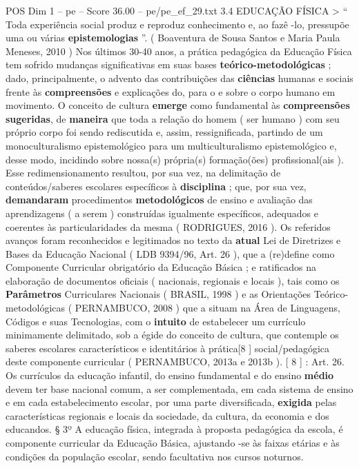 \begin{textsample}{POS Dim 1 – pe – Score 36.00 – pe/pe\_ef\_29.txt}  \label{ex:f1_pos_249}
3.4 EDUCAÇÃO FÍSICA > “ Toda experiência social produz e reproduz conhecimento e, ao fazê -lo, pressupõe uma ou várias \textbf{epistemologias} ”. ( Boaventura de Sousa Santos e Maria Paula Meneses, 2010 ) Nos últimos 30-40 anos, a prática pedagógica da Educação Física tem sofrido mudanças significativas em suas bases \textbf{teórico-metodológicas} ; dado, principalmente, o advento das contribuições das \textbf{ciências} humanas e sociais frente às \textbf{compreensões} e explicações do, para o e sobre o corpo humano em movimento.
O conceito de cultura \textbf{emerge} como fundamental às \textbf{compreensões} \textbf{sugeridas}, de \textbf{maneira} que toda a relação do homem ( ser humano ) com seu próprio corpo foi sendo rediscutida e, assim, ressignificada, partindo de um monoculturalismo epistemológico para um multiculturalismo epistemológico e, desse modo, incidindo sobre nossa(s) própria(s) formação(ões) profissional(ais ).
Esse redimensionamento resultou, por sua vez, na delimitação de conteúdos/saberes escolares específicos à \textbf{disciplina} ; que, por sua vez, \textbf{demandaram} procedimentos \textbf{metodológicos} de ensino e avaliação das aprendizagens ( a serem ) construídas igualmente específicos, adequados e coerentes às particularidades da mesma ( RODRIGUES, 2016 ).
Os referidos avanços foram reconhecidos e legitimados no texto da \textbf{atual} Lei de Diretrizes e Bases da Educação Nacional ( LDB 9394/96, Art. 26 ), que a (re)define como Componente Curricular obrigatório da Educação Básica ; e ratificados na elaboração de documentos oficiais ( nacionais, regionais e locais ), tais como os \textbf{Parâmetros} Curriculares Nacionais ( BRASIL, 1998 ) e as Orientações Teórico-metodológicas ( PERNAMBUCO, 2008 ) que a situam na Área de Linguagens, Códigos e suas Tecnologias, com o \textbf{intuito} de estabelecer um currículo minimamente delimitado, sob a égide do conceito de cultura, que contemple os saberes escolares característicos e identitários à prática[8 ] social/pedagógica deste componente curricular ( PERNAMBUCO, 2013a e 2013b ). [ 8 ] : Art. 26.
Os currículos da educação infantil, do ensino fundamental e do ensino \textbf{médio} devem ter base nacional comum, a ser complementada, em cada sistema de ensino e em cada estabelecimento escolar, por uma parte diversificada, \textbf{exigida} pelas características regionais e locais da sociedade, da cultura, da economia e dos educandos. § 3º A educação física, integrada à proposta pedagógica da escola, é componente curricular da Educação Básica, ajustando -se às faixas etárias e às condições da população escolar, sendo facultativa nos cursos noturnos.

\end{textsample}
